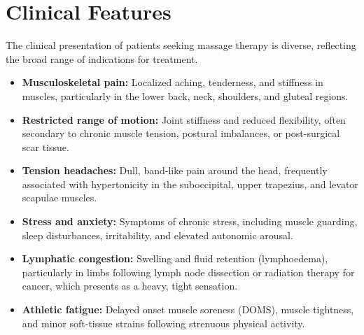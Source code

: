 \section*{Clinical Features}
The clinical presentation of patients seeking massage therapy is diverse, reflecting the broad range of indications for treatment.
\begin{itemize}
    \item \textbf{Musculoskeletal pain:} Localized aching, tenderness, and stiffness in muscles, particularly in the lower back, neck, shoulders, and gluteal regions.
    \item \textbf{Restricted range of motion:} Joint stiffness and reduced flexibility, often secondary to chronic muscle tension, postural imbalances, or post-surgical scar tissue.
    \item \textbf{Tension headaches:} Dull, band-like pain around the head, frequently associated with hypertonicity in the suboccipital, upper trapezius, and levator scapulae muscles.
    \item \textbf{Stress and anxiety:} Symptoms of chronic stress, including muscle guarding, sleep disturbances, irritability, and elevated autonomic arousal.
    \item \textbf{Lymphatic congestion:} Swelling and fluid retention (lymphoedema), particularly in limbs following lymph node dissection or radiation therapy for cancer, which presents as a heavy, tight sensation.
    \item \textbf{Athletic fatigue:} Delayed onset muscle soreness (DOMS), muscle tightness, and minor soft-tissue strains following strenuous physical activity.
\end{itemize}

